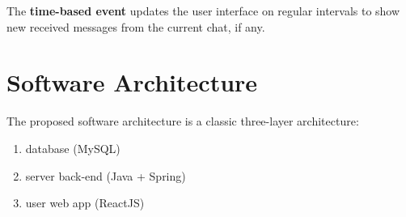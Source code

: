 \documentclass[titlepage, 12pt]{article}
\begin{document}
The \textbf{time-based event} updates the user interface on regular intervals
to show new received messages from the current chat, if any.

\section{Software Architecture}
The proposed software architecture is a classic three-layer architecture:

\begin{enumerate}
    \item database (MySQL)
    \item server back-end (Java + Spring)
    \item user web app (ReactJS)
\end{enumerate}
\end{document}
